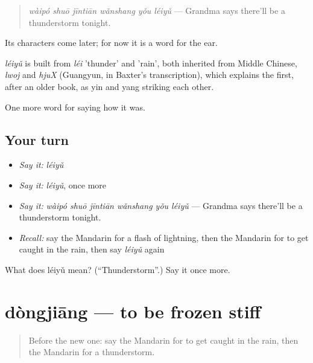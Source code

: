 \begin{quote}
\emph{wàipó shuō jīntiān wǎnshang yǒu léiyǔ} — Grandma says there'll be a thunderstorm tonight.
\end{quote}

Its characters come later; for now it is a word for the ear.

\begin{cousinweb}
\emph{léiyǔ} is built from \emph{léi} 'thunder' and  'rain', both inherited from Middle Chinese, \emph{lwoj} and \emph{hjuX} (Guangyun, in Baxter's transcription), which explains the first, after an older book, as yin and yang striking each other.
\end{cousinweb}

\begin{grammarlens}[title={What you've built}]
One more word for saying how it was.
\end{grammarlens}

\subsection*{Your turn}
\begin{itemize}
\raggedright
  \item \emph{Say it:} \emph{léiyǔ}
  \item \emph{Say it:} \emph{léiyǔ}, once more
  \item \emph{Say it:} \emph{wàipó shuō jīntiān wǎnshang yǒu léiyǔ} — Grandma says there'll be a thunderstorm tonight.
  \item \emph{Recall:} say the Mandarin for a flash of lightning, then the Mandarin for to get caught in the rain, then say \emph{léiyǔ} again
\end{itemize}

\begin{tcolorbox}[breakable,colback=teal!4,colframe=teal!35!black,title={Before you move on}]
What does léiyǔ mean? (\textquotedblleft{}Thunderstorm\textquotedblright{}.) Say it once more.
\end{tcolorbox}
\section[dòngjiāng]{dòngjiāng — to be frozen stiff}

\label{lesson:ZH-C514-dongjiang}



\begin{quote}
Before the new one: say the Mandarin for to get caught in the rain, then the Mandarin for a thunderstorm.
\end{quote}

